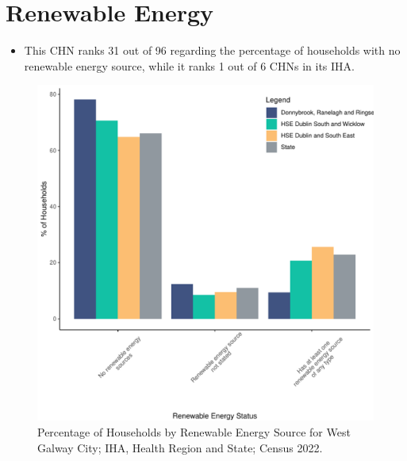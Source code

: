 \documentclass{article}
\begin{document}
\section{Renewable Energy}\label{sect:RE}
\begin{itemize}
\item This CHN ranks  31 out of 96 regarding the percentage of households with no renewable energy source, while it ranks   1 out of 6 CHNs in its IHA.
\end{itemize}
\begin{figure}[H]
	\centering
	\includegraphics[width = 140mm]{../figures/RenewableEnergyED.pdf}
	\caption{Percentage of Households by Renewable Energy Source for West Galway City; IHA, Health Region and State; Census 2022.}
	\label{fig:vbnv}
	\end{figure}
\end{document}
